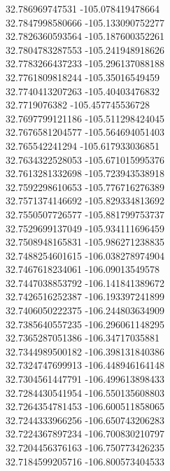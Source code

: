 {32.786969747531	-105.078419478664\\
32.7847998580666	-105.133090752277\\
32.7826360593564	-105.187600352261\\
32.7804783287553	-105.241948918626\\
32.7783266437233	-105.296137088188\\
32.7761809818244	-105.35016549459\\
32.7740413207263	-105.40403476832\\
32.7719076382	-105.457745536728\\
32.7697799121186	-105.511298424045\\
32.7676581204577	-105.564694051403\\
32.765542241294	-105.617933036851\\
32.7634322528053	-105.671015995376\\
32.7613281332698	-105.723943538918\\
32.7592298610653	-105.776716276389\\
32.7571374146692	-105.829334813692\\
32.7550507726577	-105.881799753737\\
32.7529699137049	-105.934111696459\\
32.7508948165831	-105.986271238835\\
32.7488254601615	-106.038278974904\\
32.7467618234061	-106.09013549578\\
32.7447038853792	-106.141841389672\\
32.7426516252387	-106.193397241899\\
32.7406050222375	-106.244803634909\\
32.7385640557235	-106.296061148295\\
32.7365287051386	-106.34717035881\\
32.7344989500182	-106.398131840386\\
32.7324747699913	-106.448946164148\\
32.7304561447791	-106.499613898433\\
32.7284430541954	-106.550135608803\\
32.7264354781453	-106.600511858065\\
32.7244333966256	-106.650743206283\\
32.7224367897234	-106.700830210797\\
32.7204456376163	-106.750773426235\\
32.7184599205716	-106.800573404533\\
}
